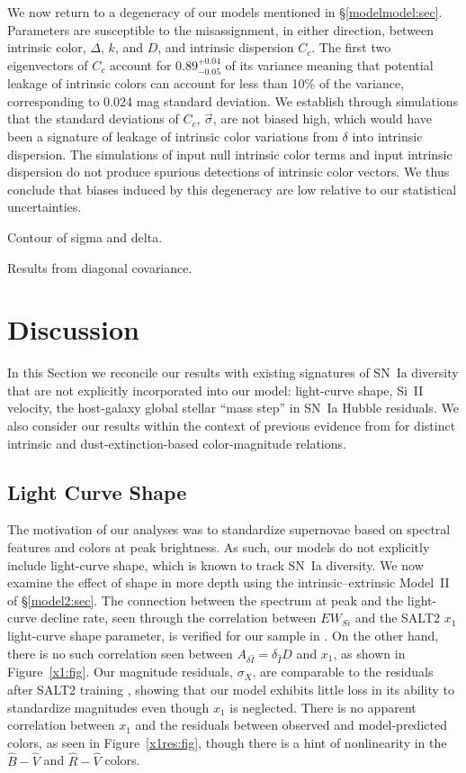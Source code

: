 \documentclass{aastex61}   	%
\begin{document}
\color{blue}
We now return to a degeneracy of our models mentioned in \S\ref{modelmodel:sec}.
Parameters are susceptible to the misassignment, in either direction, between intrinsic color, $\Delta$, $k$, and $D$, and intrinsic dispersion $C_c$.
The first two eigenvectors of $C_c$ account for $0.89_{-0.05}^{+0.04}$ of its variance  meaning
that potential leakage of intrinsic colors can account for less than 10\% of the variance, corresponding to 0.024 mag standard deviation.
We establish through simulations that the standard deviations of $C_c$, $\vec{\sigma}$,  are not biased high, which would have been a signature of leakage of
intrinsic color variations from $\delta$ into intrinsic dispersion.
The simulations of input null intrinsic color terms and input intrinsic dispersion do not produce spurious detections of intrinsic color vectors.  We thus conclude that
biases induced by this degeneracy are low relative to our statistical uncertainties.
\color{black}

\color{green}
Contour of sigma and delta.

Results from diagonal covariance.
\color{black}

\section{Discussion}
\label{discussion:sec}
In this Section
we  reconcile our results with existing
signatures of SN~Ia diversity that are not explicitly incorporated
into our model: light-curve shape, Si~II velocity, the host-galaxy global stellar ``mass step'' in SN~Ia Hubble
residuals.
We also consider our results within the context of previous evidence from
  for distinct intrinsic and dust-extinction-based
color-magnitude relations.

\subsection{Light Curve Shape}
\label{shape:sec}
The motivation of our analyses was to standardize supernovae based on spectral features and colors at peak brightness.
As such, our models do not explicitly include light-curve shape, which is known to track SN~Ia diversity.
We now examine the effect of shape in more depth using the intrinsic--extrinsic Model~II of \S\ref{model2:sec}.
The connection between the spectrum at peak and the light-curve decline rate, seen through
the correlation between $EW_{Si}$ and the SALT2 $x_1$ light-curve shape parameter, is verified
for our sample in \citet{2017Chotard}.
On the other hand, there is no such correlation seen between $A_{\delta {\hat{I}}} = \delta_{\hat{I}} D$ and $x_1$, as shown in Figure~\ref{x1:fig}. 
Our magnitude residuals, $\sigma_X$, are comparable to the residuals after SALT2 training
\citep{2010A&A...523A...7G}, showing that our model exhibits little loss in its ability to standardize
magnitudes even though $x_1$ is neglected.
There is no apparent correlation
between $x_1$ and the residuals between observed and model-predicted colors, as seen in
Figure~\ref{x1res:fig},
though there is a hint of nonlinearity in the ${\hat{B}}-{\hat{V}}$ and ${\hat{R}}-{\hat{V}}$ colors.
\end{document}
